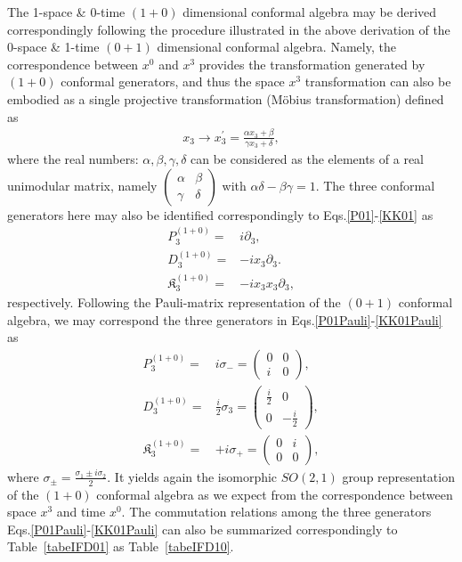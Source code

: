 \documentclass[%
 reprint,
superscriptaddress,
 amsmath,amssymb,
 aps,
]{revtex4-2}
\begin{document}
The 1-space \& 0-time $(1+0)$ dimensional conformal algebra may be derived correspondingly following the procedure illustrated in the above derivation of the 0-space \& 1-time $(0+1)$ dimensional conformal algebra. Namely, the correspondence between $x^0$ and $x^3$ provides the transformation generated by $(1+0)$ conformal generators, and thus the space $x^3$ transformation can also be embodied as a single projective transformation (Möbius transformation) defined as
\begin{align}
    x_{3}\rightarrow x^{\prime}_{3}=\frac{\alpha x_{3} +\beta}{\gamma x_{3} +\delta},
\end{align}
where the real numbers: $\alpha, \beta, \gamma, \delta$ can be considered as the elements of a real unimodular matrix, namely $\begin{pmatrix}
    \alpha &   \beta \\
  \gamma & \delta
\end{pmatrix}$ with $\alpha\delta-\beta\gamma=1$. 
The three conformal generators here may also be identified 
correspondingly to Eqs.\eqref{P01}-\eqref{KK01} as 
\begin{align}
    P^{(1+0)}_{3}=&i\partial_{3},\label{P10}\\
    D^{(1+0)}_{3}=&-ix_{3}\partial_{3}.\label{D10}\\
    \mathfrak{K}^{(1+0)}_{{3}}=&-ix_{3}x_{3}\partial_{{3}},\label{KK10}
\end{align}
respectively. Following the Pauli-matrix representation of the $(0+1)$ conformal algebra, we may correspond the three generators in Eqs.\eqref{P01Pauli}-\eqref{KK01Pauli} as 
\begin{align}
    P^{(1+0)}_{3}=&i\sigma_{-}=\begin{pmatrix}
        0&0\\
        i&0
    \end{pmatrix},\label{P10Pauli}\\
    D^{(1+0)}_{3}=&\frac{i}{2}\sigma_{3}=\begin{pmatrix}
        \frac{i}{2}&0\\
        0&-\frac{i}{2}
    \end{pmatrix},\label{D10Pauli}\\
    \mathfrak{K}^{(1+0)}_{{3}}=&+i\sigma_{+}=\begin{pmatrix}
        0&i\\
        0&0
    \end{pmatrix},\label{KK10Pauli}
\end{align}
where $\sigma_{\pm}=\frac{\sigma_{1}\pm i\sigma_{2}}{2}$. 
It yields again the isomorphic $SO(2,1)$ group representation of the $(1+0)$ conformal algebra as we expect from the correspondence between space $x^3$ and time $x^0$. The commutation relations among the three generators Eqs.\eqref{P01Pauli}-\eqref{KK01Pauli} can also be summarized correspondingly to Table~\ref{tabeIFD01} as 
Table~\ref{tabeIFD10}.   
\end{document}
